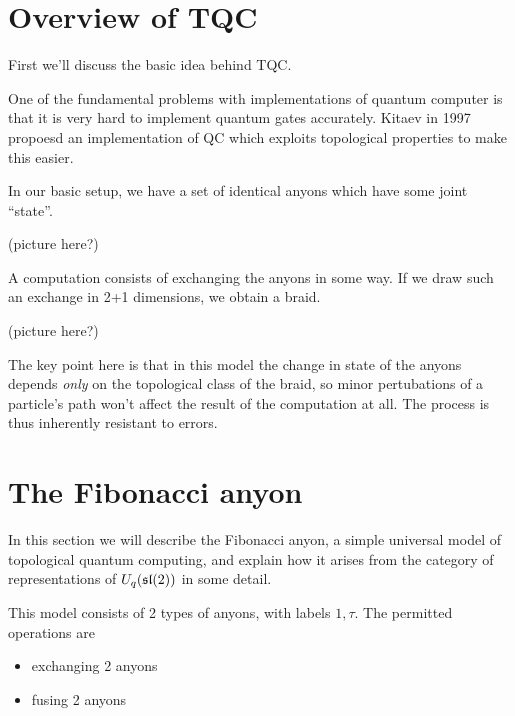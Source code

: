 \section{Overview of TQC}

First we'll discuss the basic idea behind TQC.

One of the fundamental problems with implementations of quantum computer is
that it is very hard to implement quantum gates accurately. Kitaev in 1997
propoesd an implementation of QC which exploits topological properties to make
this easier.

In our basic setup, we have a set of identical anyons which have some joint ``state''.

\begin{center}
    (picture here?)
\end{center}

A computation consists of exchanging the anyons in some way. If we draw such an
exchange in 2+1 dimensions, we obtain a braid. 

\begin{center}
    (picture here?)
\end{center}

The key point here is that in this model the change in state of the anyons
depends \emph{only} on the topological class of the braid, so minor
pertubations of a particle's path won't affect the result of the computation at
all. The process is thus inherently resistant to errors. 



\section{The Fibonacci anyon}

In this section we will describe the Fibonacci anyon, a simple universal model
of topological quantum computing, and explain how it arises from the category
of representations of $U_q(\mathfrak{sl}(2))$ in some detail. 

This model consists of 2 types of anyons, with labels $1, \tau$. The permitted
operations are 

\begin{itemize}
    \item exchanging 2 anyons
    \item fusing 2 anyons
\end{itemize}


